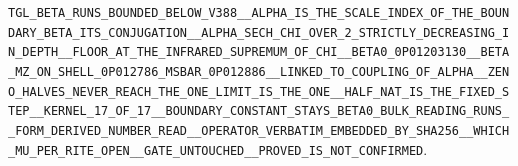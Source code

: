 \documentclass[11pt]{article}
\theoremstyle{definition}\newtheorem{deriv}{Derivação}
\begin{document}
\texttt{TGL\_\allowbreak{}BETA\_\allowbreak{}RUNS\_\allowbreak{}BOUNDED\_\allowbreak{}BELOW\_\allowbreak{}V388\_\allowbreak{}\_\allowbreak{}ALPHA\_\allowbreak{}IS\_\allowbreak{}THE\_\allowbreak{}SCALE\_\allowbreak{}INDEX\_\allowbreak{}OF\_\allowbreak{}THE\_\allowbreak{}BOUNDARY\_\allowbreak{}BETA\_\allowbreak{}ITS\_\allowbreak{}CONJUGATION\_\allowbreak{}\_\allowbreak{}ALPHA\_\allowbreak{}SECH\_\allowbreak{}CHI\_\allowbreak{}OVER\_\allowbreak{}2\_\allowbreak{}STRICTLY\_\allowbreak{}DECREASING\_\allowbreak{}IN\_\allowbreak{}DEPTH\_\allowbreak{}\_\allowbreak{}FLOOR\_\allowbreak{}AT\_\allowbreak{}THE\_\allowbreak{}INFRARED\_\allowbreak{}SUPREMUM\_\allowbreak{}OF\_\allowbreak{}CHI\_\allowbreak{}\_\allowbreak{}BETA0\_\allowbreak{}0P01203130\_\allowbreak{}\_\allowbreak{}BETA\_\allowbreak{}MZ\_\allowbreak{}ON\_\allowbreak{}SHELL\_\allowbreak{}0P012786\_\allowbreak{}MSBAR\_\allowbreak{}0P012886\_\allowbreak{}\_\allowbreak{}LINKED\_\allowbreak{}TO\_\allowbreak{}COUPLING\_\allowbreak{}OF\_\allowbreak{}ALPHA\_\allowbreak{}\_\allowbreak{}ZENO\_\allowbreak{}HALVES\_\allowbreak{}NEVER\_\allowbreak{}REACH\_\allowbreak{}THE\_\allowbreak{}ONE\_\allowbreak{}LIMIT\_\allowbreak{}IS\_\allowbreak{}THE\_\allowbreak{}ONE\_\allowbreak{}\_\allowbreak{}HALF\_\allowbreak{}NAT\_\allowbreak{}IS\_\allowbreak{}THE\_\allowbreak{}FIXED\_\allowbreak{}STEP\_\allowbreak{}\_\allowbreak{}KERNEL\_\allowbreak{}17\_\allowbreak{}OF\_\allowbreak{}17\_\allowbreak{}\_\allowbreak{}BOUNDARY\_\allowbreak{}CONSTANT\_\allowbreak{}STAYS\_\allowbreak{}BETA0\_\allowbreak{}BULK\_\allowbreak{}READING\_\allowbreak{}RUNS\_\allowbreak{}\_\allowbreak{}FORM\_\allowbreak{}DERIVED\_\allowbreak{}NUMBER\_\allowbreak{}READ\_\allowbreak{}\_\allowbreak{}OPERATOR\_\allowbreak{}VERBATIM\_\allowbreak{}EMBEDDED\_\allowbreak{}BY\_\allowbreak{}SHA256\_\allowbreak{}\_\allowbreak{}WHICH\_\allowbreak{}MU\_\allowbreak{}PER\_\allowbreak{}RITE\_\allowbreak{}OPEN\_\allowbreak{}\_\allowbreak{}GATE\_\allowbreak{}UNTOUCHED\_\allowbreak{}\_\allowbreak{}PROVED\_\allowbreak{}IS\_\allowbreak{}NOT\_\allowbreak{}CONFIRMED}.
\end{document}
